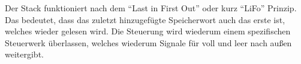 Der Stack funktioniert nach dem "`Last in First Out"' oder kurz "`LiFo"' Prinzip. Das bedeutet, dass das zuletzt hinzugefügte Speicherwort auch das erste ist, welches wieder gelesen wird. Die Steuerung wird wiederum einem spezifischen Steuerwerk überlassen, welches wiederum Signale für voll und leer nach außen weitergibt.


 
 



